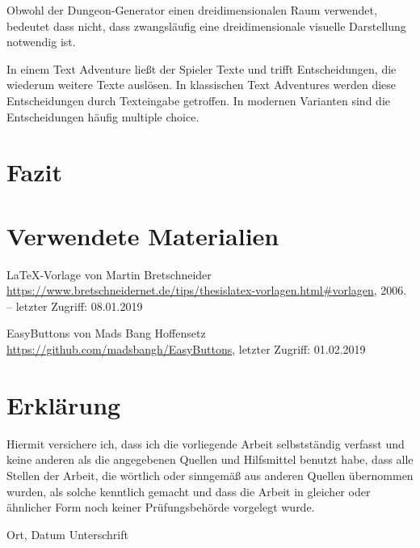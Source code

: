 Obwohl der Dungeon-Generator einen dreidimensionalen Raum verwendet, bedeutet dass nicht, dass zwangsläufig eine dreidimensionale visuelle Darstellung notwendig ist.

In einem Text Adventure ließt der Spieler Texte und trifft Entscheidungen, die wiederum weitere Texte auslösen. In klassischen Text Adventures werden diese Entscheidungen durch Texteingabe getroffen. In modernen Varianten sind die Entscheidungen häufig multiple choice.



\chapter{Fazit}\label{c.zusammenfassung}



\chapter{Verwendete Materialien}

\LaTeX -Vorlage von Martin Bretschneider 
\newblock \url{https://www.bretschneidernet.de/tips/thesislatex-vorlagen.html#vorlagen}, 2006. --
\newblock letzter Zugriff: 08.01.2019

EasyButtons von Mads Bang Hoffensetz
\newblock \url{https://github.com/madsbangh/EasyButtons},
\newblock letzter Zugriff: 01.02.2019

\label{m.tuer}




\chapter*{Erklärung}

Hiermit versichere ich, dass ich die vorliegende Arbeit selbstständig verfasst und keine anderen als die angegebenen Quellen und Hilfsmittel benutzt habe, dass alle Stellen der Arbeit, die wörtlich oder sinngemäß aus anderen Quellen übernommen wurden, als solche kenntlich gemacht und dass die Arbeit in gleicher oder ähnlicher Form noch keiner Prüfungsbehörde vorgelegt wurde.

\vspace{3cm}
Ort, Datum \hspace{5cm} Unterschrift \\

